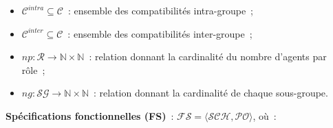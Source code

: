\begin{itemize}
\begin{itemize}
          \item $\mathcal{C}^{intra} \subseteq \mathcal{C}$~: ensemble des compatibilités intra-groupe~;
          \item $\mathcal{C}^{inter} \subseteq \mathcal{C}$~: ensemble des compatibilités inter-groupe~;
          \item $np: \mathcal{R} \rightarrow \mathbb{N} \times \mathbb{N}$~: relation donnant la cardinalité du nombre d'agents par rôle~;
          \item $ng: \mathcal{SG} \rightarrow \mathbb{N} \times \mathbb{N}$~: relation donnant la cardinalité de chaque sous-groupe.
        \end{itemize}
\end{itemize}

\medskip

\noindent \textbf{Spécifications fonctionnelles (FS)}~: \quad $\mathcal{FS} = \langle \mathcal{SCH}, \mathcal{PO} \rangle$, où~:

